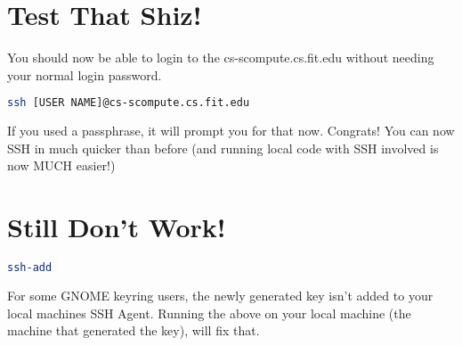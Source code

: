 \documentclass[12pt]{article}
\theoremstyle{plain}
\theoremstyle{definition}
\begin{document}
\section*{Test That Shiz!}
You should now be able to login to the cs-scompute.cs.fit.edu without needing your normal login password.
\begin{lstlisting}[language =bash]
ssh [USER NAME]@cs-scompute.cs.fit.edu
\end{lstlisting}

If you used a passphrase, it will prompt you for that now.  Congrats!  You can now SSH in much quicker than before (and running local code with SSH involved is now MUCH easier!)

\section*{Still Don't Work!}
\begin{lstlisting}[language =bash]
ssh-add
\end{lstlisting}
For some GNOME keyring users, the newly generated key isn't added to your local machines SSH Agent. Running the above on your local machine (the machine that generated the key), will fix that.
\end{document}
